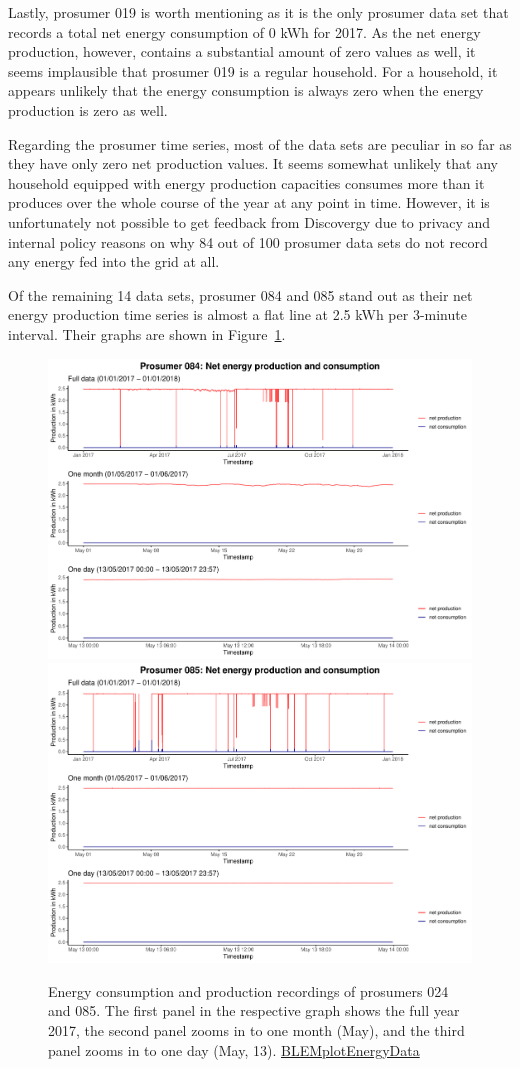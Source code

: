 Lastly, prosumer 019 is worth mentioning as it is the only prosumer data set that records a total net energy consumption of 0 kWh for 2017. As the net energy production, however, contains a substantial amount of zero values as well, it seems implausible that prosumer 019 is a regular household. For a household, it appears unlikely that the energy consumption is always zero when the energy production is zero as well.

Regarding the prosumer time series, most of the data sets are peculiar in so far as they have only zero net production values. It seems somewhat unlikely that any household equipped with energy production capacities consumes more than it produces over the whole course of the year at any point in time. However, it is unfortunately not possible to get feedback from Discovergy due to privacy and internal policy reasons on why 84 out of 100 prosumer data sets do not record any energy fed into the grid at all.

Of the remaining 14 data sets, prosumer 084 and 085 stand out as their net energy production time series is almost a flat line at 2.5 kWh per 3-minute interval. Their graphs are shown in Figure~\ref{Fig:energyconsprod_p084p085}.

\begin{figure}
\centering
\includegraphics[width=.5\textwidth-0.15em]{thesis/graphs/timeseries/p084_prod&cons.pdf}
\includegraphics[width=.5\textwidth-0.15em]{thesis/graphs/timeseries/p085_prod&cons.pdf}

\caption[Energy consumption and production recordings of prosumers 084 and 085]{Energy consumption and production recordings of prosumers 024 and 085. The first panel in the respective graph shows the full year 2017, the second panel zooms in to one month (May), and the third panel zooms in to one day (May, 13). \quantnet\href{ }{BLEMplotEnergyData}}
\label{Fig:energyconsprod_p084p085}
\end{figure}

